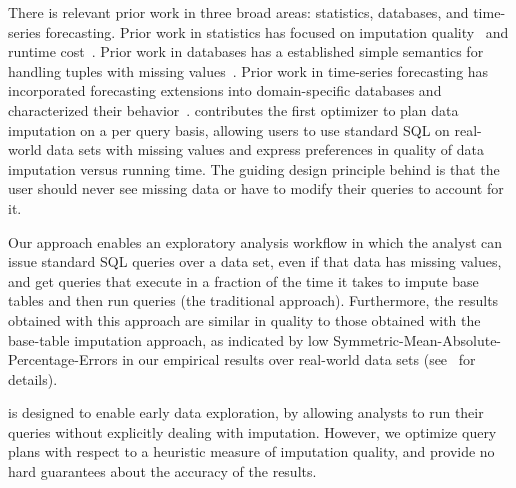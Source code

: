 There is relevant prior work in three broad areas: statistics, databases, and time-series forecasting.
Prior work in statistics has focused on imputation quality~\cite{burgette2010multiple} and runtime cost~\cite{akande2015empirical}.
Prior work in databases has a established simple semantics for handling tuples with missing values~\cite{codd1973understanding,grant1977null}.
Prior work in time-series forecasting has incorporated forecasting extensions into domain-specific databases and characterized their behavior~\cite{parisi2011embedding,parisi2013temporal,duan2007processing}.
\ProjectName{} contributes the first optimizer to plan data imputation on a per query basis, allowing users to use standard SQL on real-world data sets with missing values
and express preferences in quality of data imputation versus running time. The guiding design principle behind \ProjectName{} is that the user should never see missing data or have to modify their queries to account for it.

Our approach enables an exploratory analysis workflow in which the analyst can issue standard SQL queries over a data set, even if that data has missing values, and get
queries that execute in a fraction of the time it takes to impute base tables and then run queries (the traditional approach). Furthermore, the results obtained with this approach
are similar in quality to those obtained with the base-table imputation approach, as indicated by low Symmetric-Mean-Absolute-Percentage-Errors in our empirical results
over real-world data sets (see~ for details).

\ProjectName{} is designed to enable early data exploration, by allowing analysts to run their queries without explicitly dealing with imputation.
However, we optimize query plans with respect to a heuristic measure of imputation quality, and provide no hard guarantees about the accuracy of the results.

